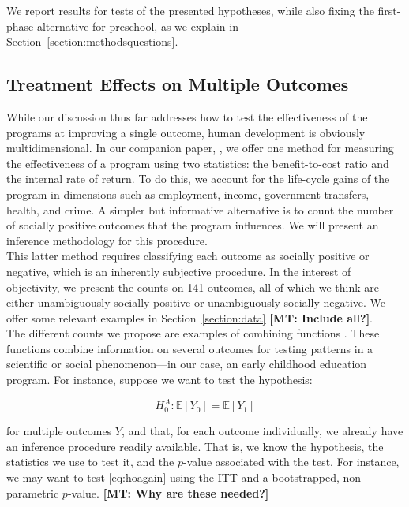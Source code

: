 \noindent We report results for tests of the presented hypotheses, while also fixing the first-phase alternative for preschool, as we explain in Section~\ref{section:methodsquestions}.

\subsection{Treatment Effects on Multiple Outcomes} \label{section:counts}

\noindent While our discussion thus far addresses how to test the effectiveness of the programs at improving a single outcome, human development is obviously multidimensional. In our companion paper, \citet{Elango_et_al_2015_ABC_unpublished}, we offer one method for measuring the effectiveness of a program using two statistics: the benefit-to-cost ratio and the internal rate of return. To do this, we account for the life-cycle gains of the program in dimensions such as employment, income, government transfers, health, and crime. A simpler but informative alternative is to count the number of socially positive outcomes that the program influences. We will present an inference methodology for this procedure.\\

\noindent This latter method requires classifying each outcome as socially positive or negative, which is an inherently subjective procedure. In the interest of objectivity, we present the counts on 141 outcomes, all of which we think are either unambiguously socially positive or unambiguously socially negative. We offer some relevant examples in Section~\ref{section:data} \textbf{[MT: Include all?]}.\\

\noindent The different counts we propose are examples of combining functions \citep[see][]{Pesarin_Salmaso_2010_PermutationTests}. These functions combine information on several outcomes for testing patterns in a scientific or social phenomenon---in our case, an early childhood education program. For instance, suppose we want to test the hypothesis: 

\begin{equation}
H_{0}^A: \mathbb{E} \left[ Y_{0} \right] =  \mathbb{E} \left[ Y_{1} \right] \label{eq:hoagain}
\end{equation}

\noindent for multiple outcomes $Y$, and that, for each outcome individually, we already have an inference procedure readily available. That is, we know the hypothesis, the statistics we use to test it, and the $p$-value associated with the test. For instance, we may want to test \eqref{eq:hoagain} using the ITT and a bootstrapped, non-parametric $p$-value. \textbf{[MT: Why are these needed?]}\\

